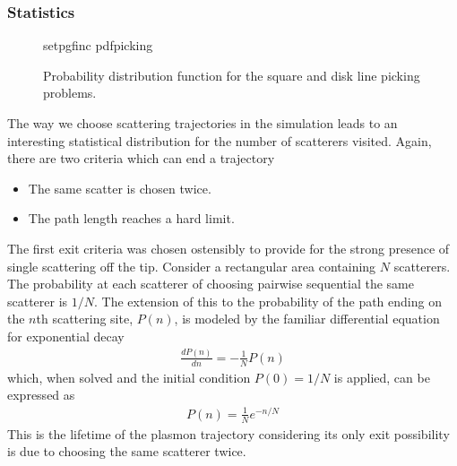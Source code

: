 \subsubsection{Statistics}
\begin{figure}[ht]
  \centering
  {setpgfinc}
  {pdfpicking}
  \caption{Probability distribution function for the square and disk line
    picking problems.}
  \label{fig:linepickingpdf}
\end{figure}
The way we choose scattering trajectories in the simulation leads to an
interesting statistical distribution for the number of scatterers visited.
Again, there are two criteria which can end a trajectory
\begin{itemize}
  \item The same scatter is chosen twice.
  \item The path length reaches a hard limit.
\end{itemize}
The first exit criteria was chosen ostensibly to provide for the strong
presence of single scattering off the tip.  Consider a rectangular area
containing $N$ scatterers.  The probability at each scatterer of choosing
pairwise sequential the same scatterer is $1/N$.  The extension of this to
the probability of the path ending on the $n$th scattering site, $P(n)$, is
modeled by the familiar differential equation for exponential decay
\begin{align}
  \frac{d P(n)}{dn} = -\frac{1}{N}P(n)
\end{align}
which, when solved and the initial condition $P(0)=1/N$ is applied, can be
expressed as
\begin{align}
  P(n)=\frac{1}{N}e^{-n/N}
\end{align}
This is the lifetime of the plasmon trajectory considering its only exit
possibility is due to choosing the same scatterer twice.

